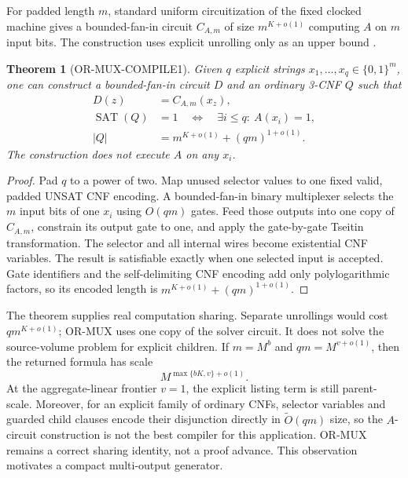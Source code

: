 \documentclass[11pt]{article}
\newtheorem{theorem}{Theorem}[section]
\newcommand{\SAT}{\operatorname{SAT}}
\begin{document}
For padded length $m$, standard uniform circuitization of the fixed clocked
machine gives a bounded-fan-in circuit $C_{A,m}$ of size
$m^{K+o(1)}$ computing $A$ on $m$ input bits.  The construction uses
explicit unrolling only as an upper bound \cite{pippengerfischer1979}.

\begin{theorem}[OR-MUX-COMPILE1]
Given $q$ explicit strings $x_1,\ldots,x_q\in\{0,1\}^m$, one can construct a
bounded-fan-in circuit $D$ and an ordinary 3-CNF $Q$ such that
\begin{align}
 D(z)&=C_{A,m}(x_z),\nonumber\\
 \SAT(Q)&=1\quad\Longleftrightarrow\quad
    \exists i\le q:\ A(x_i)=1,\label{eq:or-mux}\\
 |Q|&=m^{K+o(1)}+(qm)^{1+o(1)}.\label{eq:or-mux-size}
\end{align}
The construction does not execute $A$ on any $x_i$.
\end{theorem}

\begin{proof}
Pad $q$ to a power of two.  Map unused selector values to one fixed valid,
padded UNSAT CNF encoding.  A bounded-fan-in binary multiplexer selects the
$m$ input bits of one $x_i$ using $O(qm)$ gates.  Feed those outputs into one
copy of $C_{A,m}$, constrain its output gate to one, and apply the gate-by-gate
Tseitin transformation.  The selector and all internal wires become
existential CNF variables.  The result is satisfiable exactly when one
selected input is accepted.  Gate identifiers and the self-delimiting CNF
encoding add only polylogarithmic factors, so its encoded length is
$m^{K+o(1)}+(qm)^{1+o(1)}$.
\end{proof}

The theorem supplies real computation sharing.  Separate unrollings would
cost $qm^{K+o(1)}$; OR-MUX uses one copy of the solver circuit.  It does not
solve the source-volume problem for explicit children.  If $m=M^b$ and
$qm=M^{v+o(1)}$, then the returned formula has scale
\begin{equation}
 M^{\max\{bK,v\}+o(1)}.
 \label{eq:explicit-or-scale}
\end{equation}
At the aggregate-linear frontier $v=1$, the explicit listing term is still
parent-scale.  Moreover, for an explicit family of ordinary CNFs, selector
variables and guarded child clauses encode their disjunction directly in
$\widetilde O(qm)$ size, so the $A$-circuit construction is not the best
compiler for this application.  OR-MUX remains a correct sharing identity,
not a proof advance.  This observation motivates a compact multi-output
generator.
\end{document}
